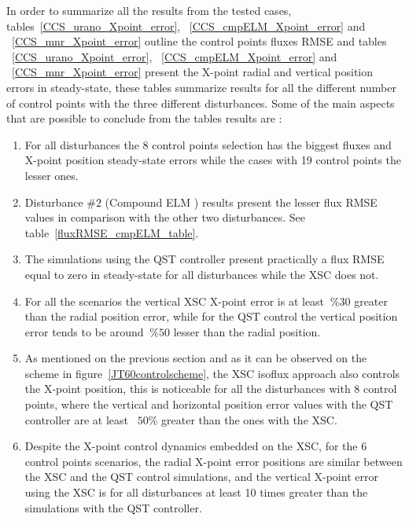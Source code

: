 In order to summarize all the results from the tested cases, tables~\ref{CCS_urano_Xpoint_error}, ~\ref{CCS_cmpELM_Xpoint_error} and ~\ref{CCS_mnr_Xpoint_error} outline the control points fluxes RMSE  and tables ~\ref{CCS_urano_Xpoint_error}, ~\ref{CCS_cmpELM_Xpoint_error} and ~\ref{CCS_mnr_Xpoint_error} present the X-point radial and vertical position errors in steady-state, these tables summarize results for all the different number of control points  with the three different disturbances. Some of the main aspects that are  possible to conclude from the tables results are :

\begin{enumerate}[label=(\alph*)]
	\item  For all disturbances the 8 control points selection has the biggest fluxes and X-point position steady-state errors while the cases with 19 control points the lesser ones.
	\item Disturbance $\#2$ (Compound ELM ) results present the lesser flux RMSE values in comparison with the other two disturbances. See table~\ref{fluxRMSE_cmpELM_table}.
	\item The simulations using the  QST controller present practically a flux RMSE equal to zero in steady-state for all disturbances while the XSC does not.
	\item For all the scenarios  the vertical XSC X-point error is  at least $~\%30$ greater  than the radial position error, while for the QST control the vertical position error tends to be around $~\%50$ lesser than the radial position.
	\item  As mentioned on the previous section and as it can be observed on the scheme in figure~\ref{JT60controlscheme}, the XSC isoflux approach also controls the X-point position, this is  noticeable for all the disturbances with 8 control points, where the vertical and horizontal position error values with the QST controller are at least ~$50 \%$ greater than the ones with the XSC.
	\item Despite the X-point control dynamics embedded on the XSC, for the 6 control points scenarios, the  radial X-point error positions are  similar between the XSC and the QST control simulations, and the vertical X-point error  using the XSC  is for all disturbances at least 10 times greater than the simulations with the QST controller.
\end{enumerate}




